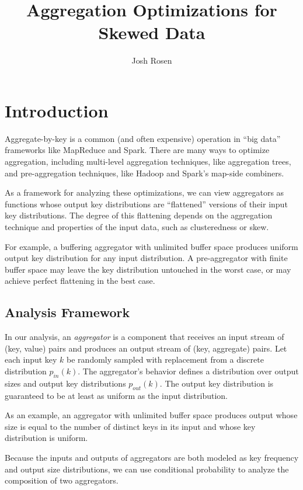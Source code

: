 \documentclass[12pt]{article}
\title{Aggregation Optimizations for Skewed Data}
\author{Josh Rosen}
\begin{document}
\maketitle

\section{Introduction}

Aggregate-by-key is a common (and often expensive) operation in ``big data''
frameworks like MapReduce and Spark.
%
There are many ways to optimize aggregation, including multi-level
aggregation techniques, like aggregation trees, and pre-aggregation
techniques, like Hadoop and Spark's map-side combiners.

As a framework for analyzing these optimizations, we can view aggregators as
functions whose output key distributions are ``flattened'' versions of their
input key distributions.  The degree of this flattening depends on the aggregation
technique and properties of the input data, such as clusteredness or skew.

For example, a buffering aggregator with unlimited buffer space produces
uniform output key distribution for any input distribution.  A pre-aggregator
with finite buffer space may leave the key distribution untouched in the worst
case, or may achieve perfect flattening in the best case.

\subsection{Analysis Framework}

In our analysis, an \emph{aggregator} is a component that receives an input
stream of (key, value) pairs and produces an output stream of (key, aggregate)
pairs.  Let each input key $k$ be randomly sampled with replacement
from a discrete distribution $p_{in}(k)$.  The aggregator's behavior defines
a distribution over output sizes and output key distributions $p_{out}(k)$.
The output key distribution is guaranteed to be at least as uniform as the
input distribution.

As an example, an aggregator with unlimited buffer space produces output whose
size is equal to the number of distinct keys in its input and whose key
distribution is uniform.

Because the inputs and outputs of aggregators are both modeled as key
frequency and output size distributions, we can use conditional probability to
analyze the composition of two aggregators.
\end{document}
